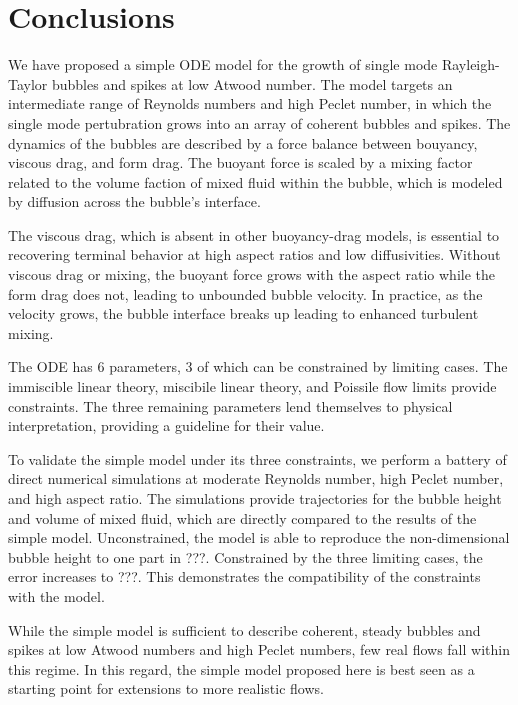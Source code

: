 \section{Conclusions}

We have proposed a simple ODE model for the growth of single mode Rayleigh-Taylor bubbles and spikes at low Atwood number.
The model targets an intermediate range of Reynolds numbers and high Peclet number, in which the single mode pertubration grows into an array of coherent bubbles and spikes.
The dynamics of the bubbles are described by a force balance between bouyancy, viscous drag, and form drag.
The buoyant force is scaled by a mixing factor related to the volume faction of mixed fluid within the bubble, which is modeled by diffusion across the bubble's interface.

The viscous drag, which is absent in other buoyancy-drag models, is essential to recovering terminal behavior at high aspect ratios and low diffusivities.  
Without viscous drag or mixing, the buoyant force grows with the aspect ratio while the form drag does not, leading to unbounded bubble velocity.
In practice, as the velocity grows, the bubble interface breaks up leading to enhanced turbulent mixing.

The ODE has 6 parameters, 3 of which can be constrained by limiting cases.
The immiscible linear theory, miscibile linear theory, and Poissile flow limits provide constraints.
The three remaining parameters lend themselves to physical interpretation, providing a guideline for their value.

To validate the simple model under its three constraints, we perform a battery of direct numerical simulations at moderate Reynolds number, high Peclet number, and high aspect ratio.
The simulations provide trajectories for the bubble height and volume of mixed fluid, which are directly compared to the results of the simple model.
Unconstrained, the model is able to reproduce the non-dimensional bubble height to one part in ???.
Constrained by the three limiting cases, the error increases to ???.
This demonstrates the compatibility of the constraints with the model.

While the simple model is sufficient to describe coherent, steady bubbles and spikes at low Atwood numbers and high Peclet numbers, few real flows fall within this regime.
In this regard, the simple model proposed here is best seen as a starting point for extensions to more realistic flows.
